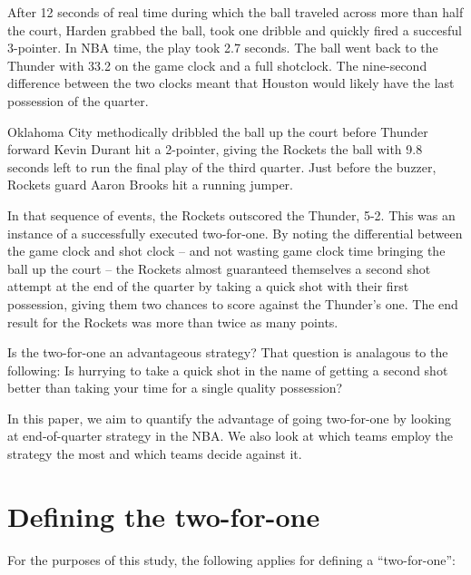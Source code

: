 \documentclass{article}
\begin{document}
After 12 seconds of real time during which the ball traveled across more than half the court, Harden grabbed the ball, took one dribble and quickly fired a succesful 3-pointer. In NBA time, the play took 2.7 seconds. The ball went back to the Thunder with 33.2 on the game clock and a full shotclock. The nine-second difference between the two clocks meant that Houston would likely have the last possession of the quarter.

Oklahoma City methodically dribbled the ball up the court before Thunder forward Kevin Durant hit a 2-pointer, giving the Rockets the ball with 9.8 seconds left to run the final play of the third quarter. Just before the buzzer, Rockets guard Aaron Brooks hit a running jumper.

In that sequence of events, the Rockets outscored the Thunder, 5-2. This was an instance of a successfully executed two-for-one. By noting the differential between the game clock and shot clock -- and not wasting game clock time bringing the ball up the court -- the Rockets almost guaranteed themselves a second shot attempt at the end of the quarter by taking a quick shot with their first possession, giving them two chances to score against the Thunder's one. The end result for the Rockets was more than twice as many points.

Is the two-for-one an advantageous strategy? That question is analagous to the following: Is hurrying to take a quick shot in the name of getting a second shot better than taking your time for a single quality possession?

In this paper, we aim to quantify the advantage of going two-for-one by looking at end-of-quarter strategy in the NBA. We also look at which teams employ the strategy the most and which teams decide against it.

\section{Defining the two-for-one}
For the purposes of this study, the following applies for defining a ``two-for-one'':
\end{document}
